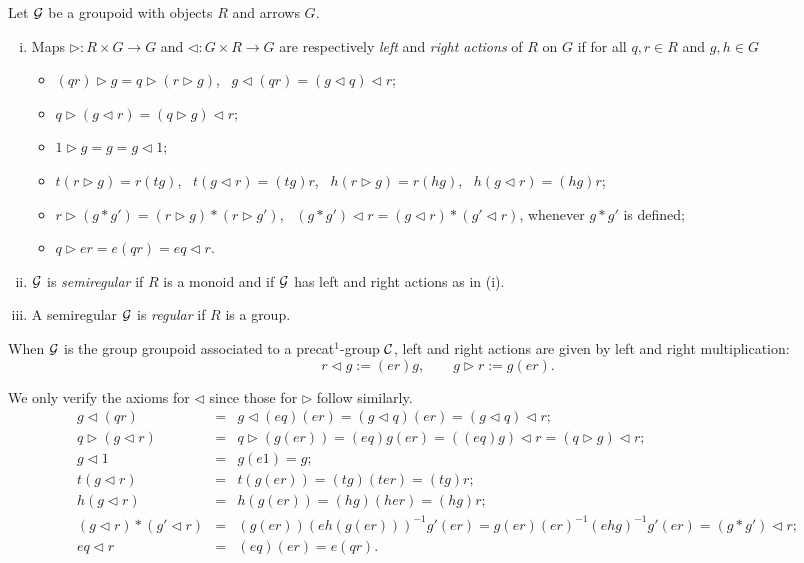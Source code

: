 \begin{defn} \label{defn:left-right-action}
Let $\mathcal{G}$ be a groupoid with objects $R$ and arrows $G$. 
\begin{enumerate}[(i)]
\item
Maps $\rhd : R \times G \to G$ and $\lhd : G \times R \to G$ 
are respectively \emph{left} and \emph{right actions} of $R$ on $G$ 
if for all $q,r \in R$ and $g,h \in G$ 
\begin{itemize} 
\item 
$(qr) \rhd g = q \rhd (r \rhd g)$,~ $g \lhd (qr) = (g \lhd q) \lhd r$; 
\item
$q \rhd (g \lhd r) = (q \rhd g) \lhd r$; 
\item
$1 \rhd g = g = g \lhd 1$; 
\item
$t(r \rhd g) = r(tg)$,~ $t(g \lhd r) = (tg)r$,~ 
$h(r \rhd g) = r(hg)$,~ $h(g \lhd r) = (hg)r$; 
\item 
$r \rhd (g * g') = (r \rhd g) * (r \rhd g')$,~ 
$(g * g') \lhd r = (g \lhd r) * (g' \lhd r)$, 
whenever $g * g'$ is defined; 
\item 
$q \rhd er = e(qr) = eq \lhd r$. 
\end{itemize}
\item 
$\mathcal{G}$ is \emph{semiregular} if $R$ is a monoid 
and if $\mathcal{G}$ has left and right actions as in (i). 
\item
A semiregular $\mathcal{G}$ is \emph{regular} if $R$ is a group. 
\end{enumerate}
\end{defn}

\begin{lem}
When $\mathcal{G}$ is the group groupoid associated to a precat$^1$-group $\mathcal{C}$, 
left and right actions are given by left and right multiplication:
$$
r \lhd g := (er)g, \qquad  g \rhd r := g(er).
$$
\end{lem}
\begin{pf}
We only verify the axioms for $\lhd$ since those for $\rhd$ follow similarly. 
\begin{eqnarray*}
g \lhd (qr) &=& g \lhd (eq)(er) = (g \lhd q)(er) = (g \lhd q) \lhd r; \\ 
q \rhd (g \lhd r) &=& q \rhd (g(er)) = (eq)g(er) 
                   =  ((eq)g) \lhd r = (q \rhd g) \lhd r; \\
g \lhd 1 &=& g(e1) = g; \\
t(g \lhd r) &=& t(g(er)) = (tg)(ter) = (tg)r; \\
h(g \lhd r) &=& h(g(er)) = (hg)(her) = (hg)r; \\
(g \lhd r)*(g' \lhd r) &=& (g(er))(eh(g(er)))^{-1}g'(er) 
     = g(er)(er)^{-1}(ehg)^{-1}g'(er) = (g*g') \lhd r; \\
eq \lhd r &=& (eq)(er) = e(qr). 
\end{eqnarray*}
\end{pf}

